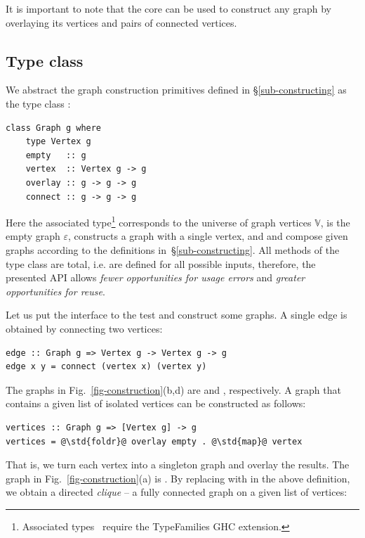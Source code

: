 \noindent
It is important to note that the core can be used to construct any graph by
overlaying its vertices and pairs of connected vertices.

\subsection{Type class}\label{sub-class}

We abstract the graph construction primitives defined in \S\ref{sub-constructing}
as the type class :

\begin{verbatim}
class Graph g where
    type Vertex g
    empty   :: g
    vertex  :: Vertex g -> g
    overlay :: g -> g -> g
    connect :: g -> g -> g
\end{verbatim}

\noindent
Here the associated type\footnote{Associated
types~\cite{2005_associated_type_chakravarty} require the \textsf{TypeFamilies}
GHC extension.}  corresponds to the universe of graph
vertices $\mathbb{V}$,  is the empty graph
$\varepsilon$,  constructs a graph with a single vertex,
and  and  compose given graphs according to
the definitions in~\S\ref{sub-constructing}. All methods of the type class
are total, i.e. are defined for all possible inputs, therefore,
the presented API allows \emph{fewer opportunities for usage errors}
and \emph{greater opportunities for reuse}.

Let us put the interface to the test and construct some graphs. A single edge is
obtained by connecting two vertices:

\begin{verbatim}
edge :: Graph g => Vertex g -> Vertex g -> g
edge x y = connect (vertex x) (vertex y)
\end{verbatim}

\noindent
The graphs in Fig.~\ref{fig-construction}(b,d) are  and
, respectively.
A graph that contains a given list of isolated vertices can be constructed
as follows:

\begin{verbatim}
vertices :: Graph g => [Vertex g] -> g
vertices = @\std{foldr}@ overlay empty . @\std{map}@ vertex
\end{verbatim}

\noindent
That is, we turn each vertex into a singleton graph and overlay the results.
The graph in Fig.~\ref{fig-construction}(a) is .
By replacing  with  in the above
definition, we obtain a directed \emph{clique} -- a fully connected graph
on a given list of vertices:

